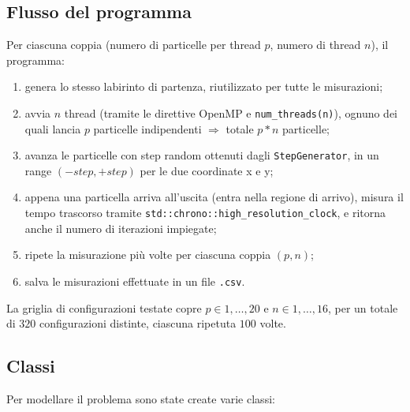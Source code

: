 \documentclass{article}
\newcommand{\code}[1]{\texttt{#1}}
\begin{document}
\subsection{Flusso del programma}
Per ciascuna coppia (numero di particelle per thread $p$, numero di thread $n$), il programma:
\begin{enumerate}
    \item genera lo stesso labirinto di partenza, riutilizzato per tutte le misurazioni;
    \item avvia $n$ thread (tramite le direttive OpenMP e \code{num\_threads(n)}), ognuno dei quali lancia $p$ particelle indipendenti $\Rightarrow$ totale $p*n$ particelle;
    \item avanza le particelle con step random ottenuti dagli \code{StepGenerator}, in un range $(-step, +step)$ per le due coordinate x e y;
    \item appena una particella arriva all'uscita (entra nella regione di arrivo), misura il tempo trascorso tramite \code{std::chrono::high\_resolution\_clock}, e ritorna anche il numero di iterazioni impiegate;
    \item ripete la misurazione più volte per ciascuna coppia $(p, n)$;
    \item salva le misurazioni effettuate in un file \code{.csv}.
\end{enumerate}
La griglia di configurazioni testate copre $p \in {1, \dots, 20}$ e $n \in {1, \dots, 16}$, per un totale di $320$ configurazioni distinte, ciascuna ripetuta $100$ volte.

\subsection{Classi}
Per modellare il problema sono state create varie classi:
\end{document}
